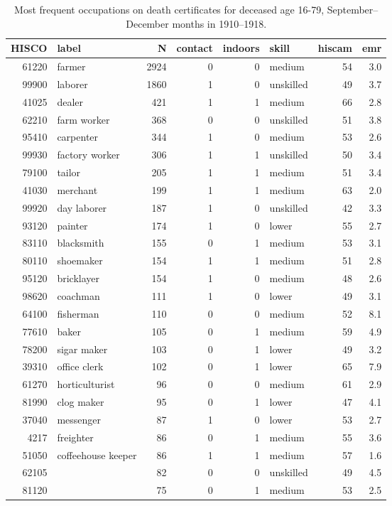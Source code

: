 \begin{table}[h!]
\centering
\begin{tabular}{rlrrrlrr}
  \hline
HISCO & label & N & contact & indoors & skill & hiscam & emr \\ 
  \hline
61220 & farmer & 2924 &  0 &  0 & medium & 54 & 3.0 \\ 
  99900 & laborer & 1860 &  1 &  0 & unskilled & 49 & 3.7 \\ 
  41025 & dealer & 421 &  1 &  1 & medium & 66 & 2.8 \\ 
  62210 & farm worker & 368 &  0 &  0 & unskilled & 51 & 3.8 \\ 
  95410 & carpenter & 344 &  1 &  0 & medium & 53 & 2.6 \\ 
  99930 & factory worker & 306 &  1 &  1 & unskilled & 50 & 3.4 \\ 
  79100 & tailor & 205 &  1 &  1 & medium & 51 & 3.4 \\ 
  41030 & merchant & 199 &  1 &  1 & medium & 63 & 2.0 \\ 
  99920 & day laborer & 187 &  1 &  0 & unskilled & 42 & 3.3 \\ 
  93120 & painter & 174 &  1 &  0 & lower & 55 & 2.7 \\ 
  83110 & blacksmith & 155 &  0 &  1 & medium & 53 & 3.1 \\ 
  80110 & shoemaker & 154 &  1 &  1 & medium & 51 & 2.8 \\ 
  95120 & bricklayer & 154 &  1 &  0 & medium & 48 & 2.6 \\ 
  98620 & coachman & 111 &  1 &  0 & lower & 49 & 3.1 \\ 
  64100 & fisherman & 110 &  0 &  0 & medium & 52 & 8.1 \\ 
  77610 & baker & 105 &  0 &  1 & medium & 59 & 4.9 \\ 
  78200 & sigar maker & 103 &  0 &  1 & lower & 49 & 3.2 \\ 
  39310 & office clerk & 102 &  0 &  1 & lower & 65 & 7.9 \\ 
  61270 & horticulturist & 96 &  0 &  0 & medium & 61 & 2.9 \\ 
  81990 & clog maker & 95 &  0 &  1 & lower & 47 & 4.1 \\ 
  37040 & messenger & 87 &  1 &  0 & lower & 53 & 2.7 \\ 
  4217 & freighter & 86 &  0 &  1 & medium & 55 & 3.6 \\ 
  51050 & coffeehouse keeper & 86 &  1 &  1 & medium & 57 & 1.6 \\ 
  62105 &  & 82 &  0 &  0 & unskilled & 49 & 4.5 \\ 
  81120 &  & 75 &  0 &  1 & medium & 53 & 2.5 \\ 
   \hline
\end{tabular}
\caption{Most frequent occupations on death certificates for deceased age 16-79, September--December months in 1910--1918.} 
\label{tab:topoccs_selected}
\end{table}

